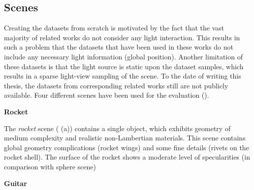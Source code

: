 





\subsection{Scenes}
\label{subsec:scenes}

Creating the datasets from scratch is motivated by the fact that
the vast majority of related works do not consider any light interaction.
This results in such a problem that the datasets that have been used in these works
do not include any necessary light information (global position).
Another limitation of these datasets is that the light source is static upon the dataset samples,
which results in a sparse light-view sampling of the scene.
To the date of writing this thesis, the datasets from corresponding related works \cite{nerv2021}
still are not publicly available.
Four different scenes have been used for the evaluation ().






\textbf{Rocket}

The \textit{rocket} scene ( (a)) contains a single object,
which exhibits geometry of medium complexity and realistic non-Lambertian materials.
This scene contains global geometry complications (rocket wings) and some fine details (rivets on the rocket shell).
The surface of the rocket shows a moderate level of specularities (in comparison with sphere scene)

\textbf{Guitar}


